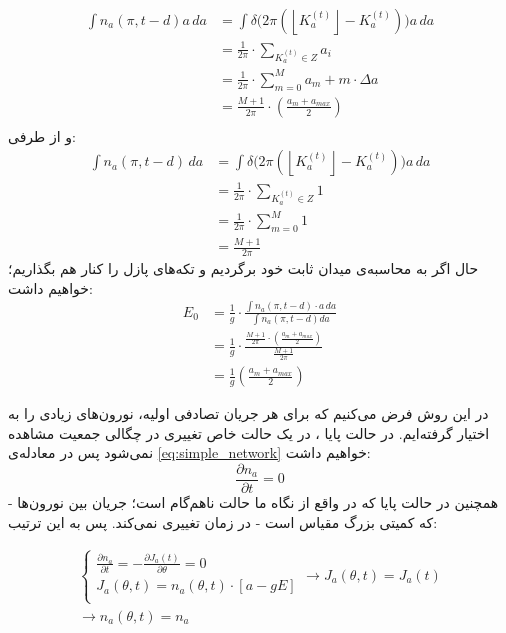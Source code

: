\documentclass[12pt,onecolumn,a4paper]{article}
\newcommand{\floor}[1]{\left\lfloor #1 \right\rfloor}
\begin{document}
\begin{align}
\int n_a(\pi,t-d)a\,da &= \int \delta \bigg( 2\pi ( \floor{K^{(t)}_a} - K^{(t)}_a) \bigg) a\,da\\
&= \frac{1}{2\pi} \cdot \sum_{K^{(t)}_a \in Z} a_i \\
&= \frac{1}{2\pi} \cdot \sum^{M}_{m=0} a_m + m \cdot \Delta a\\
&= \frac{M+1}{2\pi} \cdot ( \frac{a_m +a_{max} }{2} )\\
\end{align}
و از طرفی:
\begin{align}
\int n_a(\pi,t-d)\,da &= \int \delta \bigg( 2\pi ( \floor{K^{(t)}_a} - K^{(t)}_a) \bigg) a\,da\\
&= \frac{1}{2\pi} \cdot \sum_{K^{(t)}_a \in Z} 1 \\
&= \frac{1}{2\pi} \cdot \sum^{M}_{m=0}  1\\
&= \frac{M+1}{2\pi}
\end{align}
حال اگر به محاسبه‌ی میدان ثابت خود برگردیم و تکه‌های پازل را کنار هم بگذاریم؛ خواهیم داشت:
\begin{align}
E_0 &= \frac{1}{g}\cdot \frac{\int n_a(\pi,t-d)\cdot a\,da}{\int n_a(\pi,t-d) da } \\
&= \frac{1}{g}\cdot \frac{ \frac{M+1}{2\pi} \cdot ( \frac{a_m +a_{max} }{2} ) }{ \frac{M+1}{2\pi} } \\
&= \frac{1}{g} ( \frac{a_m +a_{max} }{2} )
\end{align}

در این روش فرض می‌کنیم که برای هر جریان تصادفی اولیه، نورون‌های زیادی را به اختیار گرفته‌ایم. در حالت پایا  ، در یک حالت خاص تغییری در چگالی جمعیت مشاهده نمی‌شود پس در معادله‌ی
\ref{eq:simple_network}
خواهیم داشت:
\begin{equation}
\frac{\partial n_a}{\partial t} = 0
\end{equation}
همچنین در حالت پایا که در واقع از نگاه ما حالت ناهم‌گام است؛ جریان بین نورون‌ها - که کمیتی بزرگ مقیاس است -  در زمان تغییری نمی‌کند. پس به این ترتیب:

\begin{align}
\begin{cases}
\frac{\partial n_a}{\partial t} = - \frac{\partial J_{a}(t)}{\partial \theta} = 0\\
J_{a}(\theta, t) = n_a(\theta,t) \cdot [ a - g E ]\\
\end{cases}
\rightarrow J_{a}(\theta, t) = J_{a}(t)\\
\rightarrow n_{a}(\theta, t) = n_{a}\\
\end{align}
\end{document}
